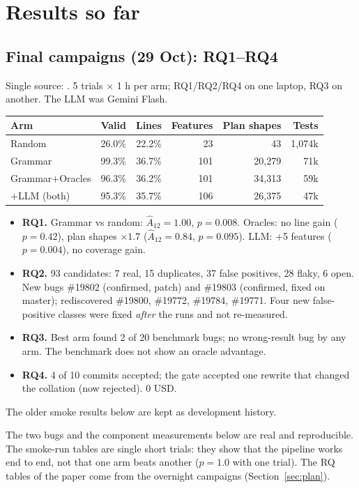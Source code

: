 \section{Results so far}

\subsection{Final campaigns (29 Oct): RQ1--RQ4}
Single source: . 5 trials $\times$ 1 h per arm;
RQ1/RQ2/RQ4 on one laptop, RQ3 on another. The LLM was Gemini Flash.
\begin{tabular}{@{}lrrrrr@{}}
\toprule
Arm & Valid & Lines & Features & Plan shapes & Tests \\
\midrule
Random & 26.0\% & 22.2\% & 23 & 43 & 1{,}074k \\
Grammar & 99.3\% & 36.7\% & 101 & 20{,}279 & 71k \\
Grammar+Oracles & 96.3\% & 36.2\% & 101 & 34{,}313 & 59k \\
+LLM (both) & 95.3\% & 35.7\% & 106 & 26{,}375 & 47k \\
\bottomrule
\end{tabular}

\begin{itemize}
  \item \textbf{RQ1.} Grammar vs random: $\hat A_{12}=1.00$, $p=0.008$. Oracles: no
    line gain ($p=0.42$), plan shapes $\times1.7$ ($\hat A_{12}=0.84$, $p=0.095$).
    LLM: +5 features ($p=0.004$), no coverage gain.
  \item \textbf{RQ2.} 93 candidates: 7 real, 15 duplicates, 37 false positives,
    28 flaky, 6 open. New bugs \#19802 (confirmed, patch) and \#19803 (confirmed,
    fixed on master); rediscovered \#19800, \#19772, \#19784, \#19771. Four new
    false-positive classes were fixed \emph{after} the runs and not re-measured.
  \item \textbf{RQ3.} Best arm found 2 of 20 benchmark bugs; no wrong-result bug
    by any arm. The benchmark does not show an oracle advantage.
  \item \textbf{RQ4.} 4 of 10 commits accepted; the gate accepted one rewrite
    that changed the collation (now rejected). 0 USD.
\end{itemize}
The older smoke results below are kept as development history.

\label{sec:results}

\begin{warnbox}
The two bugs and the component measurements below are real and reproducible.
The smoke-run tables are single short trials: they show that the pipeline
works end to end, not that one arm beats another ($p=1.0$ with one trial).
The RQ tables of the paper come from the overnight campaigns (Section~\ref{sec:plan}).
\end{warnbox}

